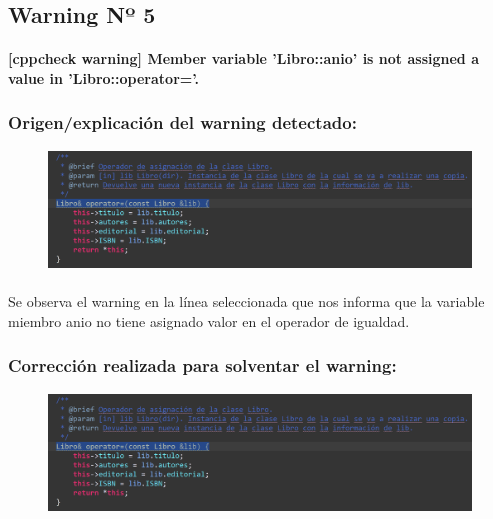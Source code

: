 	\subsection{Warning Nº 5}
	
		\paragraph{[cppcheck warning] Member variable 'Libro::anio' is not assigned a value in 'Libro::operator='.}
	
		\subsubsection{Origen/explicación del warning detectado:}
		
			\begin{figure}[H]
				\centering
				\includegraphics[scale=0.55]{img/esteban2.png}
				\label{esteban2}
			\end{figure}
		
			\paragraph{}Se observa el warning en la línea seleccionada que nos informa que la variable miembro anio no tiene asignado valor en el operador de igualdad.
			
		\subsubsection{Corrección realizada para solventar el warning:}
		
			\begin{figure}[H]
				\centering
				\includegraphics[scale=0.55]{img/esteban3.png}
				\label{esteban3}
			\end{figure}
		
